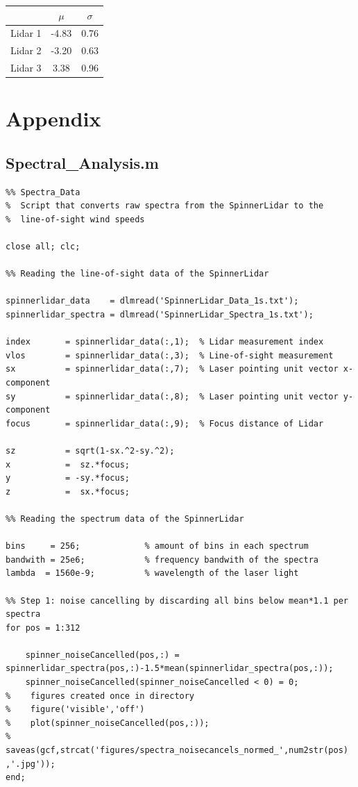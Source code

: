 \documentclass[10pt]{article}
\begin{document}
\begin{tabular}{c||c|c|}
& $\mu$& $\sigma$\\
\hline
Lidar 1 &-4.83 & 0.76 \\
Lidar 2 &-3.20 & 0.63\\
Lidar 3 & 	3.38& 0.96\\
\end{tabular}
\newpage
\appendix
\section{Appendix}
\subsection{Spectral\_Analysis.m}
\begin{lstlisting}
%% Spectra_Data
%  Script that converts raw spectra from the SpinnerLidar to the
%  line-of-sight wind speeds

close all; clc;

%% Reading the line-of-sight data of the SpinnerLidar

spinnerlidar_data    = dlmread('SpinnerLidar_Data_1s.txt');
spinnerlidar_spectra = dlmread('SpinnerLidar_Spectra_1s.txt');

index       = spinnerlidar_data(:,1);  % Lidar measurement index
vlos      	= spinnerlidar_data(:,3);  % Line-of-sight measurement
sx          = spinnerlidar_data(:,7);  % Laser pointing unit vector x-component
sy         	= spinnerlidar_data(:,8);  % Laser pointing unit vector y-component
focus       = spinnerlidar_data(:,9);  % Focus distance of Lidar

sz          = sqrt(1-sx.^2-sy.^2);
x           =  sz.*focus;
y           = -sy.*focus;
z           =  sx.*focus;
               
%% Reading the spectrum data of the SpinnerLidar

bins     = 256;             % amount of bins in each spectrum
bandwith = 25e6;            % frequency bandwith of the spectra
lambda  = 1560e-9;          % wavelength of the laser light

%% Step 1: noise cancelling by discarding all bins below mean*1.1 per spectra
for pos = 1:312
    
    spinner_noiseCancelled(pos,:) = spinnerlidar_spectra(pos,:)-1.5*mean(spinnerlidar_spectra(pos,:));
    spinner_noiseCancelled(spinner_noiseCancelled < 0) = 0;
%    figures created once in directory
%    figure('visible','off')
%    plot(spinner_noiseCancelled(pos,:));
%    saveas(gcf,strcat('figures/spectra_noisecancels_normed_',num2str(pos) ,'.jpg'));
end;


\end{lstlisting}
\end{document}
